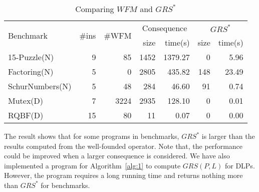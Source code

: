 \documentclass{article}
\newcommand{\WFM}{W\!F\!M}
\newcommand{\GRS}{G\!R\!S}
\begin{document}
\begin{table}[htp]
\caption{Comparing $\WFM$ and $\GRS^*$}\label{tab:tab1}
\centering
{\scriptsize
  \begin{tabular}{|l|r|r|r|r|r|r|}
    \hline
    \multirow{2}{*}{Benchmark} & \multirow{2}{*}{\#ins} & \multirow{2}{*}{\#WFM} & \multicolumn{2}{c|}{Consequence} & \multicolumn{2}{c|}{$\GRS^*$}\\
    \cline{4-7}
    & & & size & time(s) & size & time(s) \\
    \hline
    15-Puzzle(N)	&9	&85	&1452	&1379.27	&0	&5.96 \\
    Factoring(N)                        &5    &0    &2805  &435.82              &148  &23.49\\
    SchurNumbers(N) & 5 & 48 & 284 & 46.60 & 91 & 0.74\\
    Mutex(D)                            &7    &3224    &2935   &128.10           &0  &0.01\\
    RQBF(D)  &15   &80      &11     &0.07             &0   &0.00 \\
    \hline
  \end{tabular}}
\end{table}

The result shows that for some programs in benchmarks, $\GRS^*$ is larger than the results computed from the well-founded operator. Note that, the performance could be improved when a larger consequence is considered.
We have also implemented a program for Algorithm~\ref{alg:1} to compute $\GRS(P, L)$ for DLPs. However, the program requires a long running time and returns nothing more than $\GRS^*$ for benchmarks.
\end{document}
